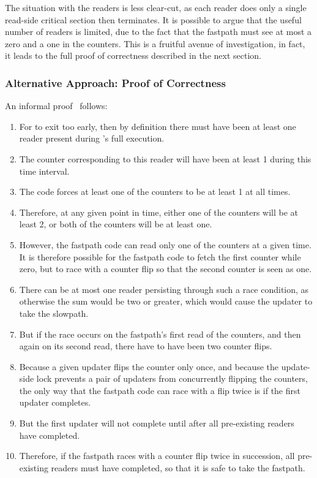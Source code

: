 The situation with the readers is less clear-cut, as each reader
does only a single read-side critical section then terminates.
It is possible to argue that the useful number of readers is limited,
due to the fact that the fastpath must see at most a zero and a one
in the counters.
This is a fruitful avenue of investigation, in fact, it leads to
the full proof of correctness described in the next section.

\subsubsection{Alternative Approach:
				     Proof of Correctness}
\label{sec:formal:Alternative Approach: Proof of Correctness}

An informal proof~\cite{PaulMcKenney2007QRCUpatch}
follows:

\begin{enumerate}
\item	For  to exit too early, then
	by definition there must have been at least one reader
	present during 's full
	execution.
\item	The counter corresponding to this reader will have been
	at least 1 during this time interval.
\item	The  code forces at least one
	of the counters to be at least 1 at all times.
\item	Therefore, at any given point in time, either one of the
	counters will be at least 2, or both of the counters will
	be at least one.
\item	However, the  fastpath code
	can read only one of the counters at a given time.
	It is therefore possible for the fastpath code to fetch
	the first counter while zero, but to race with a counter
	flip so that the second counter is seen as one.
\item	There can be at most one reader persisting through such
	a race condition, as otherwise the sum would be two or
	greater, which would cause the updater to take the slowpath.
\item	But if the race occurs on the fastpath's first read of the
	counters, and then again on its second read, there have
	to have been two counter flips.
\item	Because a given updater flips the counter only once, and
	because the update-side lock prevents a pair of updaters
	from concurrently flipping the counters, the only way that
	the fastpath code can race with a flip twice is if the
	first updater completes.
\item	But the first updater will not complete until after all
	pre-existing readers have completed.
\item	Therefore, if the fastpath races with a counter flip
	twice in succession, all pre-existing readers must have
	completed, so that it is safe to take the fastpath.
\end{enumerate}

